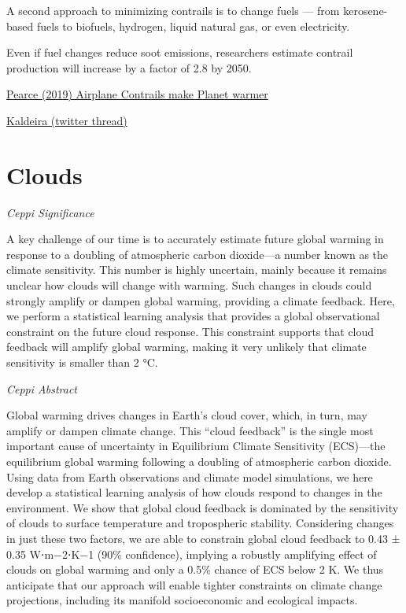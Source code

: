 \documentclass[
]{book}
\begin{document}
A second approach to minimizing contrails is to change fuels --- from kerosene-based fuels to biofuels, hydrogen, liquid natural gas, or even electricity.

Even if fuel changes reduce soot emissions, researchers estimate contrail production will increase by a factor of 2.8 by 2050.

\href{https://e360.yale.edu/features/how-airplane-contrails-are-helping-make-the-planet-warmer}{Pearce (2019) Airplane Contrails make Planet warmer}

\href{https://twitter.com/KenCaldeira/status/1394648353594515460/photo/1}{Kaldeira (twitter thread)}

\hypertarget{clouds}{%
\section{Clouds}\label{clouds}}

\emph{Ceppi Significance}

A key challenge of our time is to accurately estimate future global warming in response to a doubling of atmospheric carbon dioxide---a number known as the climate sensitivity. This number is highly uncertain, mainly because it remains unclear how clouds will change with warming. Such changes in clouds could strongly amplify or dampen global warming, providing a climate feedback. Here, we perform a statistical learning analysis that provides a global observational constraint on the future cloud response. This constraint supports that cloud feedback will amplify global warming, making it very unlikely that climate sensitivity is smaller than 2 °C.

\emph{Ceppi Abstract}

Global warming drives changes in Earth's cloud cover, which, in turn, may amplify or dampen climate change. This ``cloud feedback'' is the single most important cause of uncertainty in Equilibrium Climate Sensitivity (ECS)---the equilibrium global warming following a doubling of atmospheric carbon dioxide. Using data from Earth observations and climate model simulations, we here develop a statistical learning analysis of how clouds respond to changes in the environment. We show that global cloud feedback is dominated by the sensitivity of clouds to surface temperature and tropospheric stability. Considering changes in just these two factors, we are able to constrain global cloud feedback to 0.43 ± 0.35 W⋅m−2⋅K−1 (90\% confidence), implying a robustly amplifying effect of clouds on global warming and only a 0.5\% chance of ECS below 2 K. We thus anticipate that our approach will enable tighter constraints on climate change projections, including its manifold socioeconomic and ecological impacts.
\end{document}
